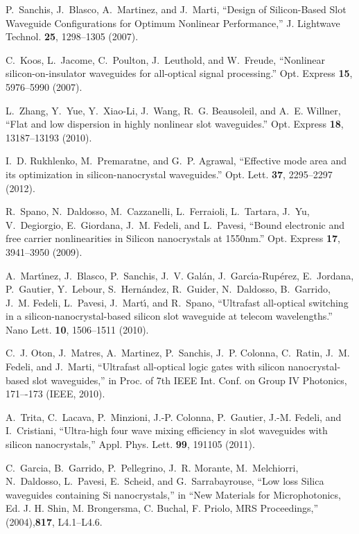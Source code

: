 \begin{thebibliography}{10}
P.~Sanchis, J.~Blasco, A.~Martinez, and J.~Marti, \enquote{{Design of
  Silicon-Based Slot Waveguide Configurations for Optimum Nonlinear
  Performance},} J. Lightwave Technol. \textbf{25}, 1298--1305
  (2007).

C.~Koos, L.~Jacome, C.~Poulton, J.~Leuthold, and W.~Freude, \enquote{{Nonlinear
  silicon-on-insulator waveguides for all-optical signal processing.}} Opt. Express \textbf{15}, 5976--5990 (2007).

L.~Zhang, Y.~Yue, Y.~Xiao-Li, J.~Wang, R.~G. Beausoleil, and A.~E. Willner,
  \enquote{{Flat and low dispersion in highly nonlinear slot waveguides.}}
  Opt. Express \textbf{18}, 13187--13193 (2010).

I.~D. Rukhlenko, M.~Premaratne, and G.~P. Agrawal, \enquote{{Effective mode
  area and its optimization in silicon-nanocrystal waveguides.}} Opt. Lett.
  \textbf{37}, 2295--2297 (2012).

R.~Spano, N.~Daldosso, M.~Cazzanelli, L.~Ferraioli, L.~Tartara, J.~Yu,
  V.~Degiorgio, E.~Giordana, J.~M. Fedeli, and L.~Pavesi, \enquote{{Bound
  electronic and free carrier nonlinearities in Silicon nanocrystals at
  1550nm.}} Opt. Express \textbf{17}, 3941--3950 (2009).

A.~Mart\'{\i}nez, J.~Blasco, P.~Sanchis, J.~V. Gal\'{a}n,
  J.~Garc\'{\i}a-Rup\'{e}rez, E.~Jordana, P.~Gautier, Y.~Lebour,
  S.~Hern\'{a}ndez, R.~Guider, N.~Daldosso, B.~Garrido, J.~M. Fedeli,
  L.~Pavesi, J.~Mart\'{\i}, and R.~Spano, \enquote{{Ultrafast all-optical
  switching in a silicon-nanocrystal-based silicon slot waveguide at telecom
  wavelengths.}} Nano Lett. \textbf{10}, 1506--1511 (2010).

C.~J. Oton, J.~Matres, A.~Martinez, P.~Sanchis, J.~P. Colonna, C.~Ratin, J.~M.
  Fedeli, and J.~Marti, \enquote{{Ultrafast all-optical logic gates with
  silicon nanocrystal-based slot waveguides},} in Proc. of 7th IEEE Int. Conf. on Group IV Photonics, 171–-173 (IEEE, 2010).

A.~Trita, C.~Lacava, P.~Minzioni, J.-P. Colonna, P.~Gautier, J.-M. Fedeli, and
  I.~Cristiani, \enquote{{Ultra-high four wave mixing efficiency in slot
  waveguides with silicon nanocrystals},} Appl. Phys. Lett. \textbf{99},
  191105 (2011).

C.~Garcia, B.~Garrido, P.~Pellegrino, J.~R. Morante, M.~Melchiorri,
  N.~Daldosso, L.~Pavesi, E.~Scheid, and G.~Sarrabayrouse, \enquote{{Low loss
  Silica waveguides containing Si nanocrystals},} in \enquote{New Materials for
  Microphotonics, Ed. J. H. Shin, M. Brongersma, C. Buchal, F. Priolo, MRS
  Proceedings,}  (2004),\textbf{817}, L4.1--L4.6.


\end{thebibliography}
